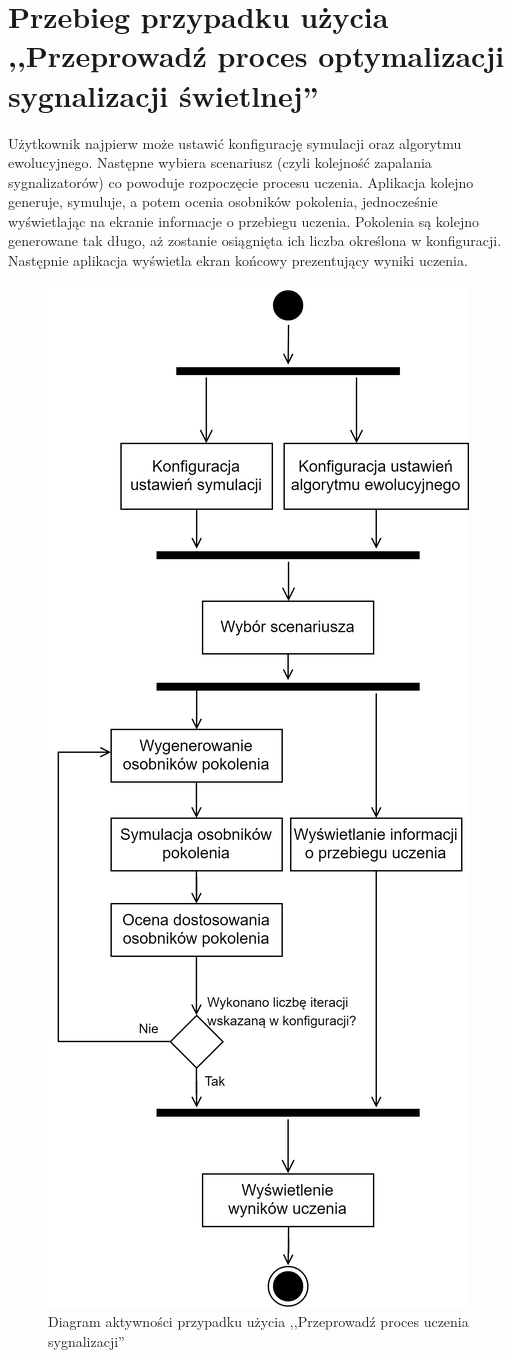 \section*{Przebieg przypadku użycia ,,Przeprowadź proces optymalizacji sygnalizacji świetlnej''}
Użytkownik najpierw może ustawić konfigurację symulacji oraz algorytmu ewolucyjnego. Następne wybiera scenariusz (czyli kolejność zapalania sygnalizatorów) co powoduje rozpoczęcie procesu uczenia. Aplikacja kolejno generuje, symuluje, a potem ocenia osobników pokolenia, jednocześnie wyświetlając na ekranie informacje o przebiegu uczenia. Pokolenia są kolejno generowane tak długo, aż zostanie osiągnięta ich liczba określona w konfiguracji. Następnie aplikacja wyświetla ekran końcowy prezentujący wyniki uczenia.
\begin{figure}[H]
	\centering
	\includegraphics[height=0.8\textheight]{diagram_aktywnosci}
	\caption[Diagram aktywności przypadku użycia ,,Przeprowadź proces uczenia sygnalizacji'']{Diagram aktywności przypadku użycia ,,Przeprowadź proces uczenia sygnalizacji''}
	\label{fig:diagramaktywnosci}
\end{figure}
